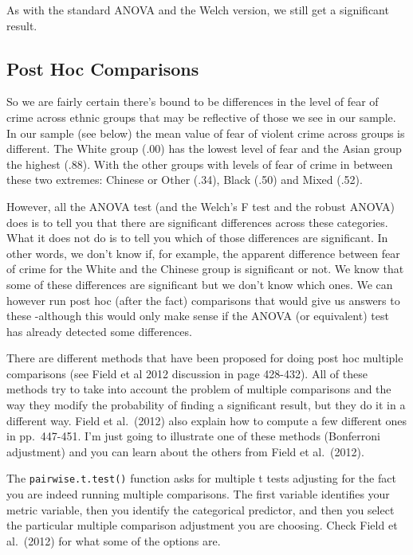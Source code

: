 \documentclass[
]{book}
\begin{document}
As with the standard ANOVA and the Welch version, we still get a significant result.

\hypertarget{post-hoc-comparisons}{%
\subsection{Post Hoc Comparisons}\label{post-hoc-comparisons}}

So we are fairly certain there's bound to be differences in the level of fear of crime across ethnic groups that may be reflective of those we see in our sample. In our sample (see below) the mean value of fear of violent crime across groups is different. The White group (.00) has the lowest level of fear and the Asian group the highest (.88). With the other groups with levels of fear of crime in between these two extremes: Chinese or Other (.34), Black (.50) and Mixed (.52).

However, all the ANOVA test (and the Welch's F test and the robust ANOVA) does is to tell you that there are significant differences across these categories. What it does not do is to tell you which of those differences are significant. In other words, we don't know if, for example, the apparent difference between fear of crime for the White and the Chinese group is significant or not. We know that some of these differences are significant but we don't know which ones. We can however run post hoc (after the fact) comparisons that would give us answers to these -although this would only make sense if the ANOVA (or equivalent) test has already detected some differences.

There are different methods that have been proposed for doing post hoc multiple comparisons (see Field et al 2012 discussion in page 428-432). All of these methods try to take into account the problem of multiple comparisons and the way they modify the probability of finding a significant result, but they do it in a different way. Field et al.~(2012) also explain how to compute a few different ones in pp.~447-451. I'm just going to illustrate one of these methods (Bonferroni adjustment) and you can learn about the others from Field et al.~(2012).

The \texttt{pairwise.t.test()} function asks for multiple t tests adjusting for the fact you are indeed running multiple comparisons. The first variable identifies your metric variable, then you identify the categorical predictor, and then you select the particular multiple comparison adjustment you are choosing. Check Field et al.~(2012) for what some of the options are.
\end{document}
